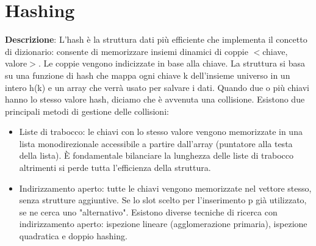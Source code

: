 \documentclass[../cheatSheetAlgoritmi.tex]{subfiles}
\begin{document}
\section{Hashing}
\textbf{Descrizione}: L'hash è la struttura dati più efficiente che implementa il concetto di dizionario: consente di memorizzare insiemi dinamici di coppie $<$chiave, valore$>$. Le coppie vengono indicizzate in base alla chiave. La struttura si basa su una funzione di hash che mappa ogni chiave k dell'insieme universo in un intero h(k)
e un array  che verrà usato per salvare i dati. Quando due o più chiavi hanno lo stesso valore hash, diciamo che è avvenuta una collisione. Esistono due principali metodi di gestione delle collisioni: 
\begin{itemize}
 	\item Liste di trabocco: le chiavi con lo stesso valore vengono memorizzate in una lista monodirezionale accessibile a partire dall'array (puntatore alla testa della lista). È fondamentale bilanciare la lunghezza delle liste di trabocco altrimenti si perde tutta l'efficienza della struttura. 
 	\item Indirizzamento aperto: tutte le chiavi vengono memorizzate nel vettore stesso, senza strutture aggiuntive. Se lo slot scelto per l'inserimento p già utilizzato, se ne cerca uno "alternativo". Esistono diverse tecniche di ricerca con indirizzamento aperto: ispezione lineare (agglomerazione primaria), ispezione quadratica e doppio hashing. 
\end{itemize}
\end{document}

